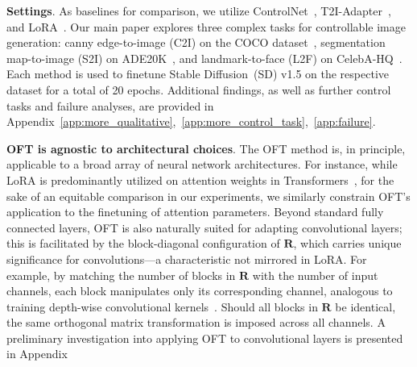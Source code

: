 \begin{itemize}[leftmargin=*,nosep]

\textbf{Settings}. As baselines for comparison, we utilize ControlNet~\cite{zhang2023adding}, T2I-Adapter~\cite{mou2023t2i}, and LoRA~\cite{hulora2022}. Our main paper explores three complex tasks for controllable image generation: canny edge-to-image (C2I) on the COCO dataset~\cite{lin2014microsoft}, segmentation map-to-image (S2I) on ADE20K~\cite{zhou2017scene}, and landmark-to-face (L2F) on CelebA-HQ~\cite{karras2018progressive,xia2021tedigan}. Each method is used to finetune Stable Diffusion~(SD) v1.5 on the respective dataset for a total of 20 epochs. Additional findings, as well as further control tasks and failure analyses, are provided in Appendix~\ref{app:more_qualitative},~\ref{app:more_control_task},~\ref{app:failure}.

\textbf{OFT is agnostic to architectural choices}. The OFT method is, in principle, applicable to a broad array of neural network architectures. For instance, while LoRA is predominantly utilized on attention weights in Transformers~\cite{hulora2022}, for the sake of an equitable comparison in our experiments, we similarly constrain OFT’s application to the finetuning of attention parameters. Beyond standard fully connected layers, OFT is also naturally suited for adapting convolutional layers; this is facilitated by the block-diagonal configuration of $\bm{R}$, which carries unique significance for convolutions—a characteristic not mirrored in LoRA. For example, by matching the number of blocks in $\bm{R}$ with the number of input channels, each block manipulates only its corresponding channel, analogous to training depth-wise convolutional kernels~\cite{chollet2017xception}. Should all blocks in $\bm{R}$ be identical, the same orthogonal matrix transformation is imposed across all channels. A preliminary investigation into applying OFT to convolutional layers is presented in Appendix~


\end{itemize}

